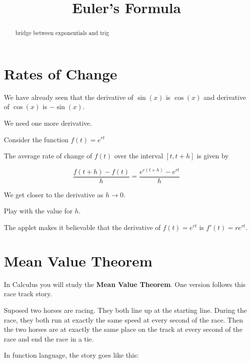 \documentclass{ximera}
\title{Euler's Formula}
\begin{document}
\begin{abstract}
bridge between exponentials and trig
\end{abstract}
\maketitle





\section{Rates of Change}

We have already seen that the derivative of $\sin(x)$ is $\cos(x)$ and derivative of $\cos(x)$ is $-\sin(x)$.

We need one more derivative.


Consider the function $f(t) = e^{r t}$

The average rate of change of $f(t)$ over the interval $[t, t+h]$ is given by 

\[   \frac{f(t+h)-f(t)}{h} = \frac{e^{r(t+h)}-e^{r t}}{h}         \]


We get closer to the derivative as $h \to 0$.


\begin{center}
\end{center}

Play with the value for $h$.

The applet makes it believable that the derivative of $f(t) = e^{r t}$  is $f'(t) = r e^{r t}$.





\section{Mean Value Theorem}



In Calculus you will study the \textbf{Mean Value Theorem}. One version follows this race track story.


Suposed two horses are racing.  They both line up at the starting line.  During the race, they both run at exactly the same speed at every second of the race.  Then the two horses are at exactly the same place on the track at every second of the race and end the race in a tie.




In function language, the story goes like this:
\end{document}

